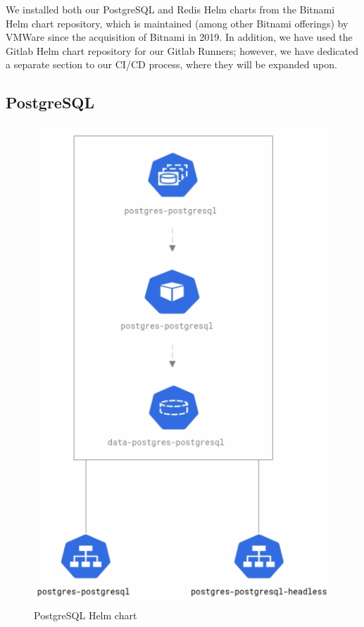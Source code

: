 \documentclass[thesis=B,english]{FITthesis}[2019/12/23]
\begin{document}
We installed both our PostgreSQL and Redis Helm charts from the Bitnami Helm chart repository, which is maintained (among other Bitnami offerings) by VMWare since the acquisition of Bitnami in 2019. \cite{bitnami} In addition, we have used the Gitlab Helm chart repository for our Gitlab Runners; however, we have dedicated a separate section to our CI/CD process, where they will be expanded upon.

\clearpage

\subsection{PostgreSQL}

\begin{figure}[htbp!]
\centering
\caption{PostgreSQL Helm chart}
\hspace*{0.4cm}
\includegraphics[scale=0.6]{postgres-diagram}
\end{figure}
\end{document}
